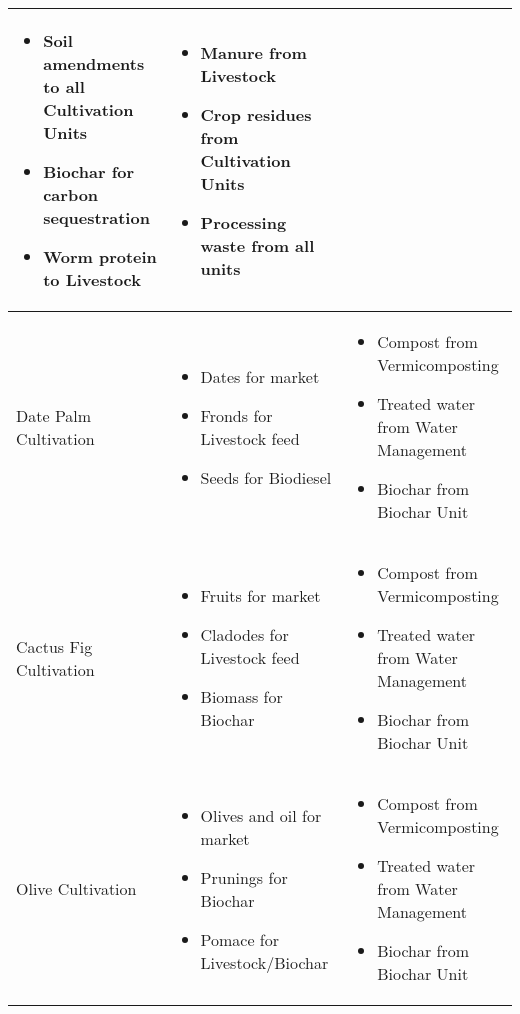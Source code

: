 \begin{table}[h]
\begin{tabular}{|p{2.5cm}|p{5cm}|p{5cm}|}
\begin{itemize}
    \item Soil amendments to all Cultivation Units
    \item Biochar for carbon sequestration
    \item Worm protein to Livestock
\end{itemize} & 
\begin{itemize}
    \item Manure from Livestock
    \item Crop residues from Cultivation Units
    \item Processing waste from all units
\end{itemize} \\
\hline
Date Palm Cultivation & 
\begin{itemize}
    \item Dates for market
    \item Fronds for Livestock feed
    \item Seeds for Biodiesel
\end{itemize} & 
\begin{itemize}
    \item Compost from Vermicomposting
    \item Treated water from Water Management
    \item Biochar from Biochar Unit
\end{itemize} \\
\hline
Cactus Fig Cultivation & 
\begin{itemize}
    \item Fruits for market
    \item Cladodes for Livestock feed
    \item Biomass for Biochar
\end{itemize} & 
\begin{itemize}
    \item Compost from Vermicomposting
    \item Treated water from Water Management
    \item Biochar from Biochar Unit
\end{itemize} \\
\hline
Olive Cultivation & 
\begin{itemize}
    \item Olives and oil for market
    \item Prunings for Biochar
    \item Pomace for Livestock/Biochar
\end{itemize} & 
\begin{itemize}
    \item Compost from Vermicomposting
    \item Treated water from Water Management
    \item Biochar from Biochar Unit
\end{itemize} \\
\hline
\end{tabular}
\end{table}

